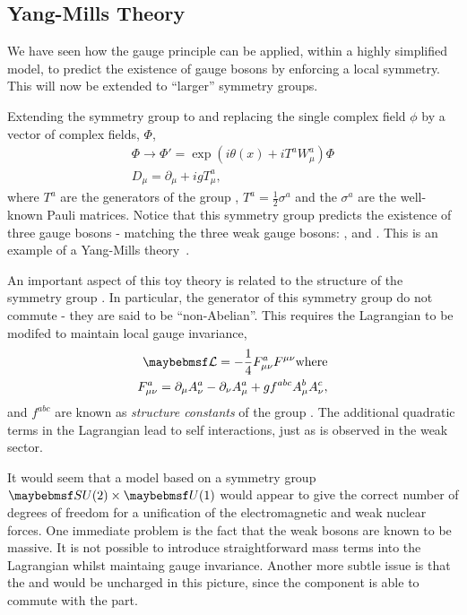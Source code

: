 \subsection{Yang-Mills Theory}
We have seen how the gauge principle can be applied, within a highly simplified
model, to predict the existence of gauge bosons by enforcing a local
symmetry. This will now be extended to ``larger'' symmetry groups.

Extending the symmetry group to \SUtwo and replacing the single complex field
$\phi$ by a vector of complex fields, $\Phi$,
\begin{eqnarray*}
\Phi \longrightarrow \Phi' = \exp\left(i\theta(x) + iT^a W^a_{\mu}\right)\Phi\\
D_{\mu} = \partial_{\mu} + igT^a_{\mu},
\end{eqnarray*}
where $T^a$ are the generators of the group \SUtwo, $T^a = \frac{1}{2}\sigma^a$
and the $\sigma^a$ are the well-known Pauli matrices. Notice that this symmetry
group predicts the existence of three gauge bosons - matching the three weak
gauge bosons: \PZ, \PWp and \PWm. This is an example of a Yang-Mills
theory~\cite{yangmills}.

An important aspect of this toy theory is related to the structure of the
symmetry group \SUtwo. In particular, the generator of this symmetry group do
not commute - they are said to be ``non-Abelian''. This requires the Lagrangian
to be modifed to maintain local gauge invariance,
\begin{eqnarray*}
\lagrangiand = -\frac{1}{4}F^a_{\mu\nu}F^{\mu\nu} \textrm{where}\\
F^a_{\mu\nu} = \partial_{\mu} A^a_{\nu} - \partial_{\nu} A^a_{\mu} + g f^{abc}
A^b_{\mu} A^c_{\nu},
\end{eqnarray*}
and $f^{abc}$ are known as \emph{structure constants} of the group \SUtwo. The
additional quadratic terms in the Lagrangian lead to self interactions, just as
is observed in the weak sector.

It would seem that a model based on a symmetry group $\SUtwo\times\Uone$ would
appear to give the correct number of degrees of freedom for a unification of the
electromagnetic and weak nuclear forces. One immediate problem is the fact that
the weak bosons are known to be massive. It is not possible to introduce
straightforward mass terms into the Lagrangian whilst maintaing gauge
invariance. Another more subtle issue is that the \PWp and \PWm would be
uncharged in this picture, since the \SUtwo component is able to commute with
the \Uone part. %

